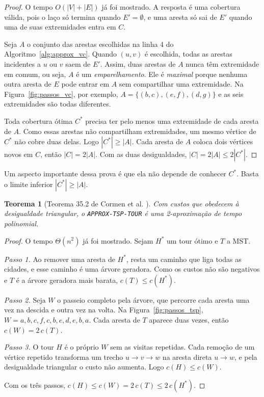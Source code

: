 \documentclass[conference]{IEEEtran}
\theoremstyle{definition}
\theoremstyle{plain}
\newtheorem{teorema}{Teorema}
\begin{document}
\begin{proof}
O tempo $O(|V| + |E|)$ já foi mostrado. A resposta é uma cobertura válida, pois o laço só termina quando $E' = \emptyset$, e uma aresta só sai de $E'$ quando uma de suas extremidades entra em $C$.

Seja $A$ o conjunto das arestas escolhidas na linha 4 do Algoritmo~\ref{alg:approx_vc}. Quando $(u,v)$ é escolhida, todas as arestas incidentes a $u$ ou $v$ saem de $E'$. Assim, duas arestas de $A$ nunca têm extremidade em comum, ou seja, $A$ é um \textit{emparelhamento}. Ele é \textit{maximal} porque nenhuma outra aresta de $E$ pode entrar em $A$ sem compartilhar uma extremidade. Na Figura~\ref{fig:passos_vc}, por exemplo, $A = \{(b,c), (e,f), (d,g)\}$ e as seis extremidades são todas diferentes.

Toda cobertura ótima $C^*$ precisa ter pelo menos uma extremidade de cada aresta de $A$. Como essas arestas não compartilham extremidades, um mesmo vértice de $C^*$ não cobre duas delas. Logo $|C^*| \ge |A|$. Cada aresta de $A$ coloca dois vértices novos em $C$, então $|C| = 2|A|$. Com as duas desigualdades, $|C| = 2|A| \le 2|C^*|$.
\end{proof}

Um aspecto importante dessa prova é que ela não depende de conhecer $C^*$. Basta o limite inferior $|C^*| \ge |A|$.

\begin{teorema}[Teorema 35.2 de Cormen et al. \cite{cormen2012algoritmos}]
\label{teo:approx_tsp}
Com custos que obedecem à desigualdade triangular, o \texttt{APPROX-TSP-TOUR} é uma 2-aproximação de tempo polinomial.
\end{teorema}

\begin{proof}
O tempo $\Theta(n^2)$ já foi mostrado. Sejam $H^*$ um tour ótimo e $T$ a MST.

\textit{Passo 1.} Ao remover uma aresta de $H^*$, resta um caminho que liga todas as cidades, e esse caminho é uma árvore geradora. Como os custos não são negativos e $T$ é a árvore geradora mais barata, $c(T) \le c(H^*)$.

\textit{Passo 2.} Seja $W$ o passeio completo pela árvore, que percorre cada aresta uma vez na descida e outra vez na volta. Na Figura~\ref{fig:passos_tsp}, $W = a,b,c,f,c,b,e,d,e,b,a$. Cada aresta de $T$ aparece duas vezes, então $c(W) = 2\,c(T)$.

\textit{Passo 3.} O tour $H$ é o próprio $W$ sem as visitas repetidas. Cada remoção de um vértice repetido transforma um trecho $u \to v \to w$ na aresta direta $u \to w$, e pela desigualdade triangular o custo não aumenta. Logo $c(H) \le c(W)$.

Com os três passos, $c(H) \le c(W) = 2\,c(T) \le 2\,c(H^*)$.
\end{proof}
\end{document}
